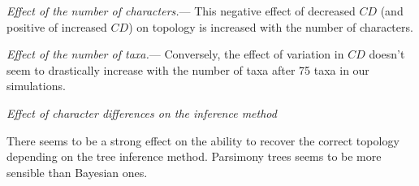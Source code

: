 \documentclass[12pt,letterpaper]{article}
\renewcommand{\subsection}[1]{%
\bigskip
\begin{center}
\begin{large}
\normalfont\itshape #1
\end{large}
\end{center}}
\renewcommand{\subsubsection}[1]{%
\vspace{2ex}
\noindent
\textit{#1.}---}
\begin{document}
\subsubsection{Effect of the number of characters}
This negative effect of decreased $CD$ (and positive of increased $CD$) on topology is increased with the number of characters.

\subsubsection{Effect of the number of taxa}
Conversely, the effect of variation in $CD$ doesn't seem to drastically increase with the number of taxa after 75 taxa in our simulations.

\subsection{Effect of character differences on the inference method}
There seems to be a strong effect on the ability to recover the correct topology depending on the tree inference method.
Parsimony trees seems to be more sensible than Bayesian ones.
\end{document}
